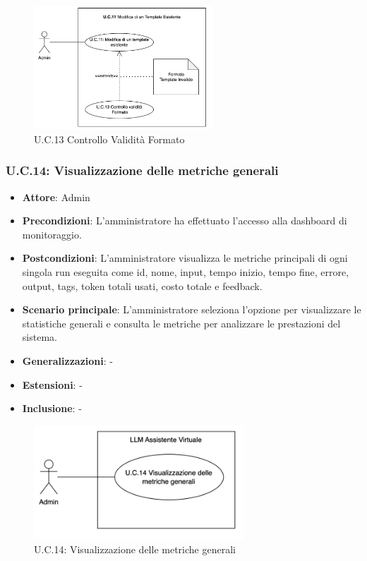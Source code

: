 \begin{figure}[H]
    \centering
    \includegraphics[width=0.6\textwidth]{img/UC13.2.png}
    \caption{U.C.13 Controllo Validità Formato}
\end{figure}
\newpage

\subsubsection{U.C.14: Visualizzazione delle metriche generali}
\begin{itemize}
    \item \textbf{Attore}: Admin
    \item \textbf{Precondizioni}: L'amministratore ha effettuato l'accesso alla dashboard di monitoraggio.
    \item \textbf{Postcondizioni}: L'amministratore visualizza le metriche principali di ogni singola run eseguita come id, nome, input, tempo inizio, tempo fine, errore, output, tags, token totali usati, costo totale e feedback.
    \item \textbf{Scenario principale}: L'amministratore seleziona l'opzione per visualizzare le statistiche generali e consulta le metriche per analizzare le prestazioni del sistema.
    \item \textbf{Generalizzazioni}: -
    \item \textbf{Estensioni}: -
    \item \textbf{Inclusione}: -
\end{itemize}
\begin{figure}[H]
    \centering
    \includegraphics[width=0.7\textwidth]{img/UC14.png}
    \caption{U.C.14: Visualizzazione delle metriche generali}
\end{figure}
\newpage

